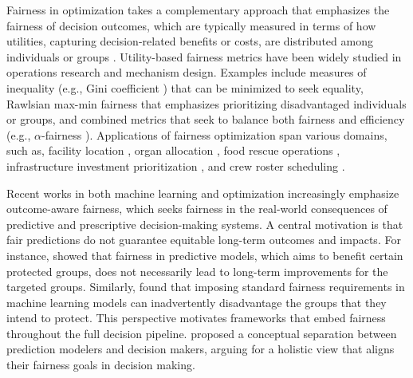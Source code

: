 \documentclass[ijoc,sglanonrev]{informs4}
\begin{document}
Fairness in optimization takes a complementary approach that emphasizes the fairness of decision outcomes, which are typically measured in terms of how utilities, capturing decision-related benefits or costs, are distributed among individuals or groups \citep{Chen2023}. Utility-based fairness metrics have been widely studied in operations research and mechanism design. Examples include measures of inequality (e.g., Gini coefficient \citep{dalton1920measurement}) that can be minimized to seek equality, Rawlsian max-min fairness \citep{rawls1971theory} that emphasizes prioritizing disadvantaged individuals or groups, and combined metrics that seek to balance both fairness and efficiency (e.g., $\alpha$-fairness \citep{mo2000fair}). Applications of fairness optimization span various domains, such as, facility location \citep{shehadeh2023reducing}, organ allocation \citep{bertsimas2013fairness}, food rescue operations \citep{EisTzu19}, infrastructure investment prioritization \citep{baghersad2025trade}, and crew roster scheduling \citep{breugem2022equality}. 

Recent works in both machine learning and optimization increasingly emphasize outcome-aware fairness, which seeks fairness in the real-world consequences of predictive and prescriptive decision-making systems. A central motivation is that fair predictions do not guarantee equitable long-term outcomes and impacts. For instance, \citet{liu2018delayed} showed that fairness in predictive models, which aims to benefit certain protected groups, does not necessarily lead to long-term improvements for the targeted groups. Similarly, \citet{corbett2023measure} found that imposing standard fairness requirements in machine learning models can inadvertently disadvantage the groups that they intend to protect. This perspective motivates frameworks that embed fairness throughout the full decision pipeline. \citet{scantamburlo2024prediction} proposed a conceptual separation between prediction modelers and decision makers, arguing for a holistic view that aligns their fairness goals in decision making. 
\end{document}
